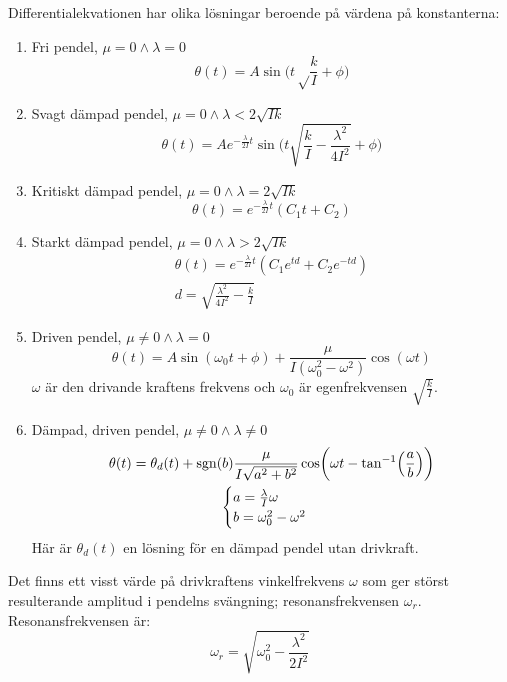 \documentclass[12pt, a4paper]{article}
\DeclareMathOperator{\sgn}{sgn}
\begin{document}
Differentialekvationen har olika lösningar beroende på värdena på konstanterna:
\begin{enumerate}
	\item Fri pendel, $\mu=0\land\lambda=0$
	\begin{equation}\label{eq:fri_pendel}
		\theta(t)=A\sin\biggl(t\sqrt\frac{k}{I}+\phi\biggr)
	\end{equation}
	\item Svagt dämpad pendel, $\mu=0\land\lambda<2\sqrt{Ik}$
	\begin{equation}\label{eq:svagt_dämpad}
		\theta(t)=Ae^{-\frac{\lambda}{2I}t}\sin\biggl(t\sqrt{\frac{k}{I}-\frac{\lambda^2}{4I^2}}+\phi\biggr)
	\end{equation}
	\item Kritiskt dämpad pendel, $\mu=0\land\lambda=2\sqrt{Ik}$
	\begin{equation}
		\theta(t)=e^{-\frac{\lambda}{2I}t}\left(C_1t+C_2\right)
	\end{equation}
	\item Starkt dämpad pendel, $\mu=0\land\lambda>2\sqrt{Ik}$
	\begin{equation}\label{eq:starkt_dämpad}
		\begin{gathered}
			\theta(t)=e^{-\frac{\lambda}{2I}t}\left(C_1e^{td}+C_2e^{-td}\right)\\
			d=\sqrt{\frac{\lambda^2}{4I^2}-\frac{k}{I}}
		\end{gathered}
	\end{equation}
	\item Driven pendel, $\mu\neq0\land\lambda=0$
	\begin{equation}\label{eq:driven}
		\theta(t)=A\sin(\omega_0t+\phi)+\frac{\mu}{I(\omega_0^2-\omega^2)}\cos(\omega t)
	\end{equation}
	$\omega$ är den drivande kraftens frekvens och $\omega_0$ är egenfrekvensen $\sqrt{\frac{k}{I}}$.
	\item Dämpad, driven pendel, $\mu\neq0\land\lambda\neq0$
	\begin{equation}\label{eq:dämpad_driven}
		\begin{gathered}
			\theta(t)=\theta_d(t)+\sgn(b)\frac{\mu}{I\sqrt{a^2+b^2}}\cos\biggl(\omega t-\tan^{-1}\Bigl(\frac{a}{b}\Bigr)\biggr)\\
			\begin{cases}
				a=\frac{\lambda}{I}\omega\\
				b=\omega_0^2-\omega^2
			\end{cases}
		\end{gathered}        
	\end{equation}
	Här är $\theta_d(t)$ en lösning för en dämpad pendel utan drivkraft. 
\end{enumerate}
Det finns ett visst värde på drivkraftens vinkelfrekvens $\omega$ som ger störst resulterande amplitud i pendelns svängning; resonansfrekvensen $\omega_r$. Resonansfrekvensen är:
\begin{equation}\label{eq:resonansfrekvens}
	\omega_r=\sqrt{\omega_0^2-\frac{\lambda^2}{2I^2}}
\end{equation}
\end{document}
